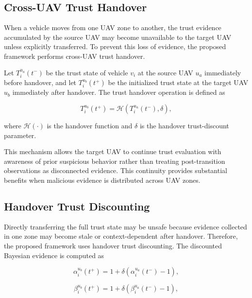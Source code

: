 \documentclass[journal]{IEEEtran}
\begin{document}
\subsection{Cross-UAV Trust Handover}
\label{subsec:trust_handover}

When a vehicle moves from one UAV zone to another, the trust evidence accumulated by the source UAV may become unavailable to the target UAV unless explicitly transferred. To prevent this loss of evidence, the proposed framework performs cross-UAV trust handover.

Let \(T_i^{u_a}(t^-)\) be the trust state of vehicle \(v_i\) at the source UAV \(u_a\) immediately before handover, and let \(T_i^{u_b}(t^+)\) be the initialized trust state at the target UAV \(u_b\) immediately after handover. The trust handover operation is defined as

\begin{equation}
T_i^{u_b}(t^+)=\mathcal{H}\left(T_i^{u_a}(t^-),\delta\right),
\label{eq:trust_handover}
\end{equation}

where \(\mathcal{H}(\cdot)\) is the handover function and \(\delta\) is the handover trust-discount parameter.

This mechanism allows the target UAV to continue trust evaluation with awareness of prior suspicious behavior rather than treating post-transition observations as disconnected evidence. This continuity provides substantial benefits when malicious evidence is distributed across UAV zones.

\subsection{Handover Trust Discounting}
\label{subsec:handover_discounting}

Directly transferring the full trust state may be unsafe because evidence collected in one zone may become stale or context-dependent after handover. Therefore, the proposed framework uses handover trust discounting. The discounted Bayesian evidence is computed as

\begin{equation}
\alpha_i^{u_b}(t^+) = 1 + \delta\left(\alpha_i^{u_a}(t^-)-1\right),
\label{eq:discount_alpha}
\end{equation}

\begin{equation}
\beta_i^{u_b}(t^+) = 1 + \delta\left(\beta_i^{u_a}(t^-)-1\right),
\label{eq:discount_beta}
\end{equation}
\end{document}
